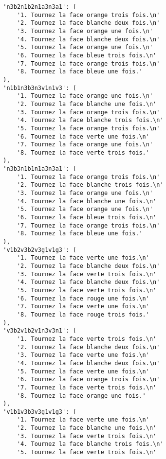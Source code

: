 \begin{lstlisting}
        'n3b2n1b2n1a3n3a1': (
            '1. Tournez la face orange trois fois.\n'
            '2. Tournez la face blanche deux fois.\n'
            '3. Tournez la face orange une fois.\n'
            '4. Tournez la face blanche deux fois.\n'
            '5. Tournez la face orange une fois.\n'
            '6. Tournez la face bleue trois fois.\n'
            '7. Tournez la face orange trois fois.\n'
            '8. Tournez la face bleue une fois.'
        ),
        'n1b1n3b3n3v1n1v3': (
            '1. Tournez la face orange une fois.\n'
            '2. Tournez la face blanche une fois.\n'
            '3. Tournez la face orange trois fois.\n'
            '4. Tournez la face blanche trois fois.\n'
            '5. Tournez la face orange trois fois.\n'
            '6. Tournez la face verte une fois.\n'
            '7. Tournez la face orange une fois.\n'
            '8. Tournez la face verte trois fois.'
        ),
        'n3b3n1b1n1a3n3a1': (
            '1. Tournez la face orange trois fois.\n'
            '2. Tournez la face blanche trois fois.\n'
            '3. Tournez la face orange une fois.\n'
            '4. Tournez la face blanche une fois.\n'
            '5. Tournez la face orange une fois.\n'
            '6. Tournez la face bleue trois fois.\n'
            '7. Tournez la face orange trois fois.\n'
            '8. Tournez la face bleue une fois.'
        ),
        'v1b2v3b2v3g1v1g3': (
            '1. Tournez la face verte une fois.\n'
            '2. Tournez la face blanche deux fois.\n'
            '3. Tournez la face verte trois fois.\n'
            '4. Tournez la face blanche deux fois.\n'
            '5. Tournez la face verte trois fois.\n'
            '6. Tournez la face rouge une fois.\n'
            '7. Tournez la face verte une fois.\n'
            '8. Tournez la face rouge trois fois.'
        ),
        'v3b2v1b2v1n3v3n1': (
            '1. Tournez la face verte trois fois.\n'
            '2. Tournez la face blanche deux fois.\n'
            '3. Tournez la face verte une fois.\n'
            '4. Tournez la face blanche deux fois.\n'
            '5. Tournez la face verte une fois.\n'
            '6. Tournez la face orange trois fois.\n'
            '7. Tournez la face verte trois fois.\n'
            '8. Tournez la face orange une fois.'
        ),
        'v1b1v3b3v3g1v1g3': (
            '1. Tournez la face verte une fois.\n'
            '2. Tournez la face blanche une fois.\n'
            '3. Tournez la face verte trois fois.\n'
            '4. Tournez la face blanche trois fois.\n'
            '5. Tournez la face verte trois fois.\n'

\end{lstlisting}
